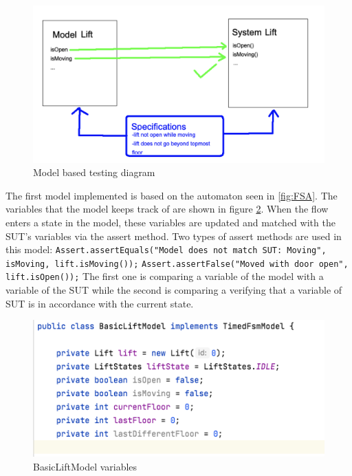 \documentclass[a4paper, 12pt]{article}
\begin{document}
\begin{figure}[h]
   \centering
   \includegraphics[width=\textwidth,height=\textheight,keepaspectratio]{images/model-based-testing-diag} %
   \caption{Model based testing diagram}
   \label{fig:model-based-testing-diag}
\end{figure}

The first model implemented is based on the automaton seen in \ref{fig:FSA}. The variables that the model keeps track of are shown in figure \ref{fig:BasicLiftModel-variables}. When the flow enters a state in the model, these variables are updated and matched with the SUT's variables via the assert method. Two types of assert methods are used in this model: \newline
\texttt{Assert.assertEquals("Model does not match SUT: Moving", isMoving, lift.isMoving());} \newline
\texttt{Assert.assertFalse("Moved with door open", lift.isOpen());}
The first one is comparing a variable of the model with a variable of the SUT while the second is comparing a verifying that a variable of SUT is in accordance with the current state.\\ 

\begin{figure}[h]
   \centering
   \includegraphics[width=\textwidth,height=\textheight,keepaspectratio]{images/BasicLiftModel-variables} %
   \caption{BasicLiftModel variables}
   \label{fig:BasicLiftModel-variables}
\end{figure}
\end{document}

